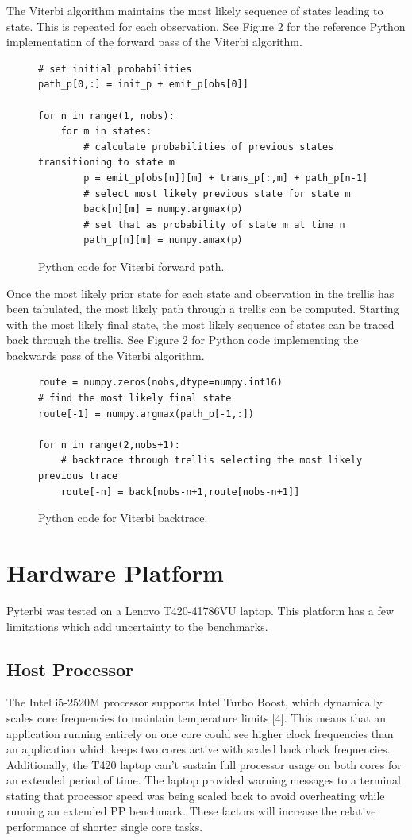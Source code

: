 \documentclass[journal,onecolumn]{IEEEtran}
\begin{document}
The Viterbi algorithm maintains the most likely sequence of states leading to state. This is repeated for each observation. See Figure 2 for the reference Python implementation of the forward pass of the Viterbi algorithm.
\begin{figure}[h!]
\begin{lstlisting}
# set initial probabilities
path_p[0,:] = init_p + emit_p[obs[0]]

for n in range(1, nobs):
    for m in states:
        # calculate probabilities of previous states transitioning to state m    
        p = emit_p[obs[n]][m] + trans_p[:,m] + path_p[n-1]
        # select most likely previous state for state m
        back[n][m] = numpy.argmax(p)
        # set that as probability of state m at time n 
        path_p[n][m] = numpy.amax(p)
\end{lstlisting}
    \label{fig:forcode}
    \caption{Python code for Viterbi forward path.}
\end{figure} 

Once the most likely prior state for each state and observation in the trellis has been tabulated, the most likely path through a trellis can be computed. Starting with the most likely final state, the most likely sequence of states can be traced back through the trellis. See Figure 2 for Python code implementing the backwards pass of the Viterbi algorithm. 
\begin{figure}[h!]
\begin{lstlisting}
route = numpy.zeros(nobs,dtype=numpy.int16)
# find the most likely final state
route[-1] = numpy.argmax(path_p[-1,:])

for n in range(2,nobs+1):
    # backtrace through trellis selecting the most likely previous trace
    route[-n] = back[nobs-n+1,route[nobs-n+1]]
\end{lstlisting}
    \label{fig:backcode}
    \caption{Python code for Viterbi backtrace.}
\end{figure}

\section{Hardware Platform}
Pyterbi was tested on a Lenovo T420-41786VU laptop. This platform has a few limitations which add uncertainty to the benchmarks. 

\subsection{Host Processor}
The Intel i5-2520M processor supports Intel Turbo Boost, which dynamically scales core frequencies to maintain temperature limits [4]. This means that an application running entirely on one core could see higher clock frequencies than an application which keeps two cores active with scaled back clock frequencies. Additionally, the T420 laptop can't sustain full processor usage on both cores for an extended period of time. The laptop provided warning messages to a terminal stating that processor speed was being scaled back to avoid overheating while running an extended PP benchmark. These factors will increase the relative performance of shorter single core tasks.  
\end{document}
